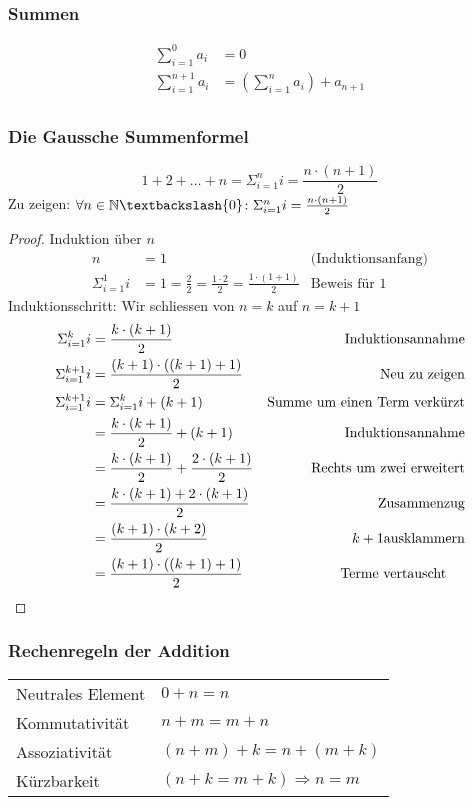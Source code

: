 \subsubsection{Summen}
\begin{align*}
	\sum_{i=1}^0 a_i& = 0\\
	\sum_{i=1}^{n+1} a_i& = \left( \sum_{i=1}^n a_i\right ) + a_{n+1}\\
\end{align*}

\subsubsection{Die Gaussche Summenformel}
\begin{equation*}
	1 + 2 + \dots + n = \Sigma_{i = 1}^{n} i = \frac{n \cdot (n+1)}{2}
\end{equation*}
Zu zeigen: $\forall n \in \N\textbackslash\{0\} \colon \Sigma_{i = 1}^n i = \frac{n \cdot (n + 1)}{2}$
\begin{proof}
	Induktion über $n$
	\begin{align*}
		n& = 1 &\mbox{(Induktionsanfang)}\\
		\Sigma_{i=1}^1 i & = 1 = \frac{2}{2} = \frac{1 \cdot 2}{2} = \frac{1 \cdot(1 + 1)}{2} &\mbox{Beweis für 1}
	\end{align*}
	Induktionsschritt: Wir schliessen von $n = k$ auf $n = k + 1$
	\begin{align*}
		\Sigma_{i=1}^k i& = \frac{k \cdot (k + 1)}{2} &\mbox{Induktionsannahme}\\
		\Sigma_{i=1}^{k+1} i& = \frac{(k + 1) \cdot ((k + 1) + 1)}{2} &\mbox{Neu zu zeigen}\\
		\Sigma_{i=1}^{k+1} i& = \Sigma_{i=1}^{k} i + (k + 1)&\mbox{Summe um einen Term verkürzt}\\
		& = \frac{k \cdot (k + 1)}{2} + (k + 1)& \mbox{Induktionsannahme}\\
		& = \frac{k \cdot (k + 1)}{2} + \frac{2 \cdot (k + 1)}{2} & \mbox{Rechts um zwei erweitert}\\
		& = \frac{k \cdot (k + 1) + 2 \cdot (k + 1)}{2}& \mbox{Zusammenzug}\\
		& = \frac{(k + 1) \cdot (k + 2)}{2} & k + 1 \mbox{ausklammern}\\
		& = \frac{(k + 1) \cdot ((k + 1) + 1)}{2} & \mbox{Terme vertauscht~~~~}\qedhere
	\end{align*}
\end{proof}

\subsubsection{Rechenregeln der Addition}
\settowidth{\MyLenA}{Neutrales Element~~}
\begin{tabular}{@{}p{\the\MyLenA}%
				@{}p{}}
	Neutrales Element 		& $0 + n = n$\\
	Kommutativität			& $n + m = m + n$\\
	Assoziativität			& $(n + m) + k = n + (m + k)$\\
	Kürzbarkeit				& $(n + k = m + k) \Rightarrow n = m$\\
\end{tabular}

